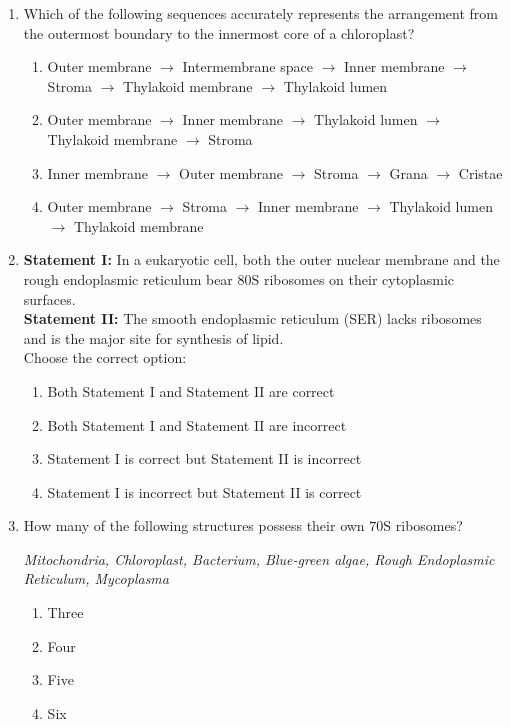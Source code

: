\documentclass[11pt, a4paper]{article}
\begin{document}
\begin{enumerate}[label=\textbf{\arabic*.}, leftmargin=*, itemsep=8pt]
    \item Which of the following sequences accurately represents the arrangement from the outermost boundary to the innermost core of a chloroplast?
    \begin{enumerate}[label=(\alph*)]
        \item Outer membrane $\rightarrow$ Intermembrane space $\rightarrow$ Inner membrane $\rightarrow$ Stroma $\rightarrow$ Thylakoid membrane $\rightarrow$ Thylakoid lumen
        \item Outer membrane $\rightarrow$ Inner membrane $\rightarrow$ Thylakoid lumen $\rightarrow$ Thylakoid membrane $\rightarrow$ Stroma
        \item Inner membrane $\rightarrow$ Outer membrane $\rightarrow$ Stroma $\rightarrow$ Grana $\rightarrow$ Cristae
        \item Outer membrane $\rightarrow$ Stroma $\rightarrow$ Inner membrane $\rightarrow$ Thylakoid lumen $\rightarrow$ Thylakoid membrane
    \end{enumerate}

    \item \textbf{Statement I:} In a eukaryotic cell, both the outer nuclear membrane and the rough endoplasmic reticulum bear $80\text{S}$ ribosomes on their cytoplasmic surfaces.\\
    \textbf{Statement II:} The smooth endoplasmic reticulum (SER) lacks ribosomes and is the major site for synthesis of lipid.\\
    Choose the correct option:
    \begin{enumerate}[label=(\alph*)]
        \item Both Statement I and Statement II are correct
        \item Both Statement I and Statement II are incorrect
        \item Statement I is correct but Statement II is incorrect
        \item Statement I is incorrect but Statement II is correct
    \end{enumerate}

    \item How many of the following structures possess their own $70\text{S}$ ribosomes?
    \begin{center}
        \textit{Mitochondria, Chloroplast, Bacterium, Blue-green algae, Rough Endoplasmic Reticulum, Mycoplasma}
    \end{center}
    \begin{enumerate}[label=(\alph*)]
        \item Three
        \item Four
        \item Five
        \item Six
    \end{enumerate}


\end{enumerate}
\end{document}
